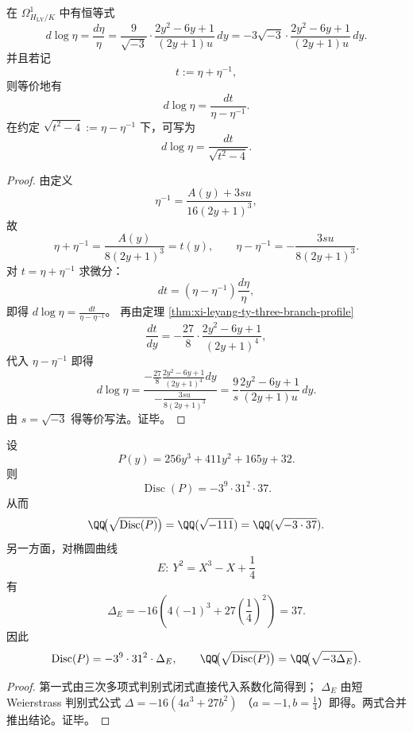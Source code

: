 \begin{conclusion}\label{con:xi-leyang-log-eta-rigid-integrable-identity}
在 \(\Omega^1_{H_{\mathrm{LY}}/K}\) 中有恒等式
\[
d\log\eta=\frac{d\eta}{\eta}
=\frac{9}{\sqrt{-3}}\cdot\frac{2y^2-6y+1}{(2y+1)u}\,dy
=-3\sqrt{-3}\cdot\frac{2y^2-6y+1}{(2y+1)u}\,dy.
\]
并且若记
\[
t:=\eta+\eta^{-1},
\]
则等价地有
\[
d\log\eta=\frac{dt}{\eta-\eta^{-1}}.
\]
在约定
\(
\sqrt{t^2-4}:=\eta-\eta^{-1}
\)
下，可写为
\[
d\log\eta=\frac{dt}{\sqrt{t^2-4}}.
\]
\end{conclusion}
\begin{proof}
由定义
\[
\eta^{-1}=\frac{A(y)+3su}{16(2y+1)^3},
\]
故
\[
\eta+\eta^{-1}=\frac{A(y)}{8(2y+1)^3}=t(y),\qquad
\eta-\eta^{-1}=-\frac{3su}{8(2y+1)^3}.
\]
对 \(t=\eta+\eta^{-1}\) 求微分：
\[
dt=(\eta-\eta^{-1})\frac{d\eta}{\eta},
\]
即得
\(
d\log\eta=\frac{dt}{\eta-\eta^{-1}}
\)。
再由定理 \ref{thm:xi-leyang-ty-three-branch-profile}
\[
\frac{dt}{dy}=-\frac{27}{8}\cdot\frac{2y^2-6y+1}{(2y+1)^4},
\]
代入 \(\eta-\eta^{-1}\) 即得
\[
d\log\eta
=\frac{-\frac{27}{8}\frac{2y^2-6y+1}{(2y+1)^4}dy}
{-\frac{3su}{8(2y+1)^3}}
=\frac{9}{s}\frac{2y^2-6y+1}{(2y+1)u}\,dy.
\]
由 \(s=\sqrt{-3}\) 得等价写法。证毕。
\end{proof}

\begin{conclusion}\label{con:xi-leyang-cubic-discriminant-minus3-deltae}
设
\[
P(y)=256y^3+411y^2+165y+32.
\]
则
\[
\operatorname{Disc}(P)=-3^9\cdot 31^2\cdot 37.
\]
从而
\[
\QQ\!\bigl(\sqrt{\operatorname{Disc}(P)}\bigr)=\QQ(\sqrt{-111})=\QQ(\sqrt{-3\cdot 37}).
\]
另一方面，对椭圆曲线
\[
E:\ Y^2=X^3-X+\frac14
\]
有
\[
\Delta_E=-16\!\left(4(-1)^3+27\left(\frac14\right)^2\right)=37.
\]
因此
\[
\operatorname{Disc}(P)=-3^9\cdot 31^2\cdot \Delta_E,
\qquad
\QQ\!\bigl(\sqrt{\operatorname{Disc}(P)}\bigr)=\QQ\!\bigl(\sqrt{-3\Delta_E}\bigr).
\]
\end{conclusion}
\begin{proof}
第一式由三次多项式判别式闭式直接代入系数化简得到；
\(\Delta_E\) 由短 Weierstrass 判别式公式
\(
\Delta=-16(4a^3+27b^2)
\)
（\(a=-1,b=\tfrac14\)）即得。两式合并推出结论。证毕。
\end{proof}

